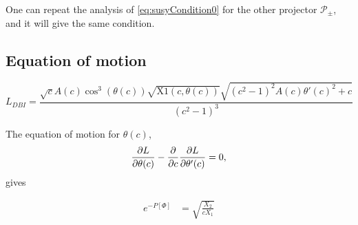 One can repeat the analysis of \eqref{eq:susyCondition0} for the other projector $\mathcal{P}_{\pm}$, and it will give the same condition. 





\subsection{Equation of motion}

\begin{equation}
 L_{DBI} = \frac{\sqrt{c} A(c) \cos ^3(\theta (c)) \sqrt{\text{X1}(c,\theta (c))} \sqrt{\left(c^2-1\right)^2 A(c) \theta '(c)^2+c}}{\left(c^2-1\right)^3}
\end{equation}

The equation of motion for $\theta(c)$,
\begin{equation}
\dfrac{\partial L}{\partial \theta(c)} - \dfrac{\partial}{\partial c} \dfrac{\partial L}{\partial \theta'(c)} = 0,
\end{equation}
gives



\begin{align*}
% 
e^{-P[\Phi]} &=\sqrt{\frac{X_2}{c X_1}}
\end{align*}
